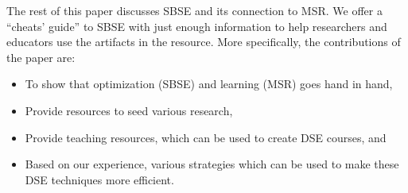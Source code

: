 \documentclass[sigconf,anonymous,review]{acmart}
\begin{document}



The rest of this paper discusses SBSE and its connection to MSR. 
We offer a ``cheats' guide'' to SBSE with just enough information to help researchers and educators use the artifacts in the resource. More specifically, the contributions of the paper are:
\begin{itemize}
    \item To show that optimization (SBSE) and learning (MSR) goes hand in hand,
    \item Provide resources to seed various research,
    \item Provide teaching resources, which can be used to create DSE courses, and
    \item Based on our experience, various strategies which can be used to make these DSE techniques more efficient.
\end{itemize}
\end{document}
